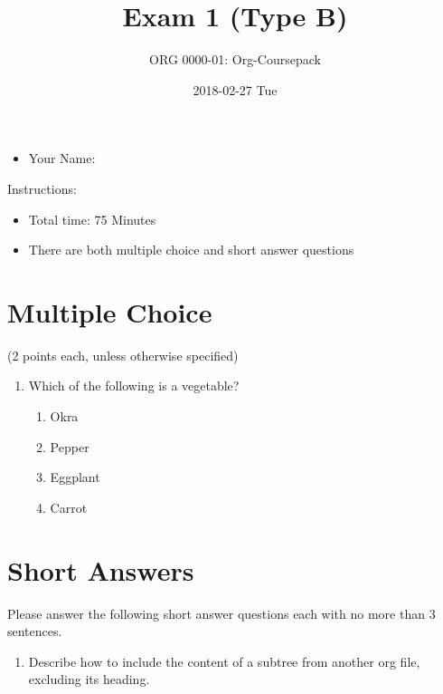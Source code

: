 \documentclass[article,letterpaper,times,10pt,listings-bw,microtype]{article}
\author{ORG 0000-01: Org-Coursepack}
\date{2018-02-27 Tue}
\title{Exam 1 (Type B)}
\begin{document}
\maketitle
\vspace{20 mm}

\begin{itemize}
\item Your Name: \underline{\hspace{4cm}}
\end{itemize}

\vspace{20 mm}

Instructions:

\begin{itemize}
\item Total time: 75 Minutes
\item There are both multiple choice and short answer questions
\end{itemize}
\clearpage
\section*{Multiple Choice}
\label{sec:org9f02b77}
(2 points each, unless otherwise specified)
\begin{enumerate}
\item Which of the following is a vegetable?
\begin{enumerate}
\item Okra
\item Pepper
\item Eggplant
\item Carrot
\end{enumerate}
\end{enumerate}
\clearpage
\section*{Short Answers}
\label{sec:org9b58f9b}
\begin{mdframed}[style=exampledefault, frametitle={}]
Please answer the following short answer questions each with no more than 3
sentences.
\end{mdframed}

\begin{enumerate}
\item Describe how to include the content of a subtree from another org file, excluding its heading.

\vspace{50 mm}
\end{enumerate}
\end{document}
